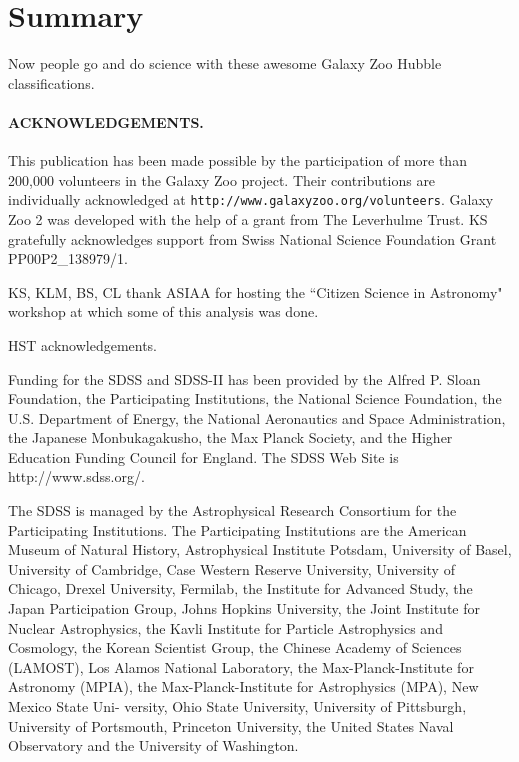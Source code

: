 \documentclass[usenatbib]{mn2e}
\begin{document}
\section{Summary}

Now people go and do science with these awesome Galaxy Zoo Hubble classifications.  
 
 
\paragraph*{ACKNOWLEDGEMENTS.} 

This publication has been made possible by the participation of more than 200,000 volunteers in the Galaxy Zoo project. Their contributions are individually acknowledged at \texttt{http://www.galaxyzoo.org/volunteers}. Galaxy Zoo 2 was developed with the help of a grant from The Leverhulme Trust. KS gratefully acknowledges support from Swiss National Science Foundation Grant PP00P2\_138979/1.

KS, KLM, BS, CL thank ASIAA for hosting the ``Citizen Science in Astronomy" workshop at which some of this analysis was done. 

HST acknowledgements.

Funding for the SDSS and SDSS-II has been provided by the Alfred P. Sloan Foundation, the Participating Institutions, the National Science Foundation, the U.S. Department of Energy, the National Aeronautics and Space Administration, the Japanese Monbukagakusho, the Max Planck Society, and the Higher Education Funding Council for England. The SDSS Web Site is http://www.sdss.org/. 

The SDSS is managed by the Astrophysical Research Consortium for the Participating Institutions. The Participating Institutions are the American Museum of Natural History, Astrophysical  Institute Potsdam, University of Basel, University of Cambridge, 
Case Western Reserve University, University of Chicago, Drexel University, Fermilab, the Institute for Advanced Study, the Japan 
Participation Group, Johns Hopkins University, the Joint Institute for Nuclear Astrophysics, the Kavli Institute for Particle Astrophysics and Cosmology, the Korean Scientist Group, the Chinese Academy of Sciences (LAMOST), Los Alamos National Laboratory, the Max-Planck-Institute for Astronomy (MPIA), the Max-Planck-Institute for Astrophysics (MPA), New Mexico State Uni- 
versity, Ohio State University, University of Pittsburgh, University of Portsmouth, Princeton University, the United States Naval Observatory and the University of Washington. 


\begin{thebibliography}{}

\end{thebibliography}
\end{document}
